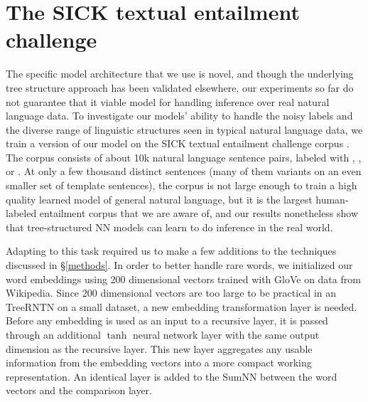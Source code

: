 \section{The SICK textual entailment challenge}\label{sec:sick}

The specific model architecture that we use is novel, and though the underlying tree structure approach has been validated elsewhere, our experiments so far do not guarantee that it viable model for handling inference over real
natural language data. To investigate our models' ability to handle the noisy labels and the diverse range of linguistic structures seen in typical natural language data, we train a version of our model on the SICK textual entailment challenge corpus \cite{marelli2014sick}. The corpus consists of about 10k natural language sentence pairs, labeled with , , or . At only a few thousand distinct sentences (many of them variants on an even smaller set of template sentences), the corpus is not large enough to train a high quality learned model of general natural language, but it is the largest human-labeled entailment corpus that we are aware of, and our results
nonetheless show that tree-structured NN models can learn to do inference in the real world.

Adapting to this task required us to make a few additions to the techniques discussed in \S\ref{methods}. In order to better handle rare words, we initialized our word embeddings using 200 dimensional vectors trained with 
GloVe \cite{pennington2014glove} on data from Wikipedia. Since 200 dimensional vectors are too large to be practical in an TreeRNTN on a small dataset, a new embedding transformation layer is needed. Before any embedding is used as an input to a recursive layer, it is passed through an additional $\tanh$ neural network layer with the same output dimension as the recursive layer. This new layer aggregates any usable information from the embedding vectors into a more compact working representation. An identical layer is added to the SumNN between the word vectors and the comparison layer.

